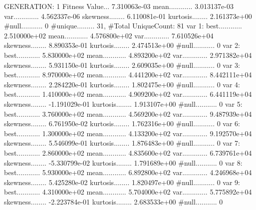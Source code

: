 \documentclass[oneside,letterpaper,titlepage]{article}
\begin{document}
\begin{Schunk}
\begin{Soutput}
GENERATION: 1
Fitness Value... 7.310063e-03
mean............ 3.013137e-03
var............. 4.562337e-06
skewness........ 6.110081e-01
kurtosis........ 2.161373e+00
#null........... 0
#unique......... 31, #Total UniqueCount: 81
var 1:
best............ 2.510000e+02
mean............ 4.576800e+02
var............. 7.610526e+04
skewness........ 8.890353e-01
kurtosis........ 2.474513e+00
#null........... 0
var 2:
best............ 5.830000e+02
mean............ 4.893200e+02
var............. 2.971382e+04
skewness........ 5.931150e-01
kurtosis........ 2.609035e+00
#null........... 0
var 3:
best............ 8.970000e+02
mean............ 4.441200e+02
var............. 8.442111e+04
skewness........ 2.284220e-01
kurtosis........ 1.802475e+00
#null........... 0
var 4:
best............ 1.410000e+02
mean............ 4.909200e+02
var............. 6.441119e+04
skewness........ -1.191029e-01
kurtosis........ 1.913107e+00
#null........... 0
var 5:
best............ 3.760000e+02
mean............ 4.569200e+02
var............. 9.487939e+04
skewness........ 6.761950e-02
kurtosis........ 1.762316e+00
#null........... 0
var 6:
best............ 1.300000e+02
mean............ 4.133200e+02
var............. 9.192570e+04
skewness........ 5.546099e-01
kurtosis........ 1.876483e+00
#null........... 0
var 7:
best............ 2.860000e+02
mean............ 4.835600e+02
var............. 6.739761e+04
skewness........ -5.330799e-02
kurtosis........ 1.791689e+00
#null........... 0
var 8:
best............ 5.930000e+02
mean............ 6.892800e+02
var............. 4.246968e+04
skewness........ 5.425280e-02
kurtosis........ 1.820497e+00
#null........... 0
var 9:
best............ 4.310000e+02
mean............ 5.704000e+02
var............. 5.775892e+04
skewness........ -2.223784e-01
kurtosis........ 2.683533e+00
#null........... 0


\end{Soutput}
\end{Schunk}
\end{document}
